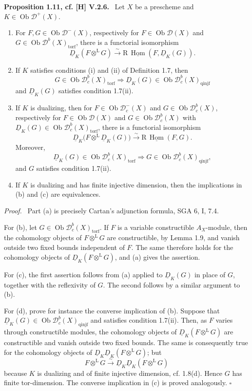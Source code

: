 \documentclass[11pt]{article}
\theoremstyle{plain}
\theoremstyle{definition}
\theoremstyle{remark}
\newenvironment{statement}[1]{\par\medskip\noindent\textbf{#1.}\ }{\par\medskip}
\newenvironment{prooftext}{\par\noindent\textit{Proof.}\ }{\par\medskip}
\newcommand{\D}{\mathcal D}\newcommand{\E}{\mathcal E}\newcommand{\F}{\mathcal F}
\DeclareMathOperator{\Hom}{Hom}
\DeclareMathOperator{\ob}{Ob}
\newcommand{\R}{\mathrm R}
\newcommand{\qedtext}{\hfill$\square$}
\begin{document}
\begin{statement}{Proposition 1.11, cf. [H] V.2.6}
Let $X$ be a prescheme and $K\in\ob\D^+(X)$.
\begin{enumerate}[label=\alph*)]
\item For $F,G\in\ob\D^-(X)$, respectively for $F\in\ob\D(X)$ and $G\in\ob\D^b(X)_{\mathrm{torf}}$, there is a functorial isomorphism
\[
   \underline D_K(F\otimes^{\mathrm L}G)\xrightarrow{\sim}
   \R\,\underline{\Hom}(F,\underline D_K(G)).
\]

\item If $K$ satisfies conditions (i) and (ii) of Definition 1.7, then
\[
   G\in\ob\D_c^b(X)_{\mathrm{torf}}
   \Longrightarrow
   \underline D_K(G)\in\ob\D_c^b(X)_{\mathrm{qinjf}}
\]
and $\underline D_K(G)$ satisfies condition 1.7(ii).

\item If $K$ is dualizing, then for $F\in\ob\D_c^-(X)$ and $G\in\ob\D_c^b(X)$, respectively for $F\in\ob\D(X)$ and $G\in\ob\D_c^b(X)$ with $\underline D_K(G)\in\ob\D_c^b(X)_{\mathrm{torf}}$, there is a functorial isomorphism
\[
   \underline D_K\bigl(F\otimes^{\mathrm L}\underline D_K(G)\bigr)
      \xrightarrow{\sim}\R\,\underline{\Hom}(F,G).
\]
Moreover,
\[
   \underline D_K(G)\in\ob\D_c^b(X)_{\mathrm{torf}}
   \Longrightarrow
   G\in\ob\D_c^b(X)_{\mathrm{qinjf}},
\]
and $G$ satisfies condition 1.7(ii).

\item If $K$ is dualizing and has finite injective dimension, then the implications in (b) and (c) are equivalences.
\end{enumerate}
\end{statement}

\begin{prooftext}
Part (a) is precisely Cartan's adjunction formula, SGA 6, I, 7.4.

For (b), let $G\in\ob\D_c^b(X)_{\mathrm{torf}}$. If $F$ is a variable constructible $A_X$-module, then the cohomology objects of $F\otimes^{\mathrm L}G$ are constructible, by Lemma 1.9, and vanish outside two fixed bounds independent of $F$. The same therefore holds for the cohomology objects of $\underline D_K(F\otimes^{\mathrm L}G)$, and (a) gives the assertion.

For (c), the first assertion follows from (a) applied to $\underline D_K(G)$ in place of $G$, together with the reflexivity of $G$. The second follows by a similar argument to (b).

For (d), prove for instance the converse implication of (b). Suppose that $\underline D_K(G)\in\ob\D_c^b(X)_{\mathrm{qinjf}}$ and satisfies condition 1.7(ii). Then, as $F$ varies through constructible modules, the cohomology objects of $\underline D_K(F\otimes^{\mathrm L}G)$ are constructible and vanish outside two fixed bounds. The same is consequently true for the cohomology objects of $\underline D_K\underline D_K(F\otimes^{\mathrm L}G)$; but
\[
   F\otimes^{\mathrm L}G\xrightarrow{\sim}\underline D_K\underline D_K(F\otimes^{\mathrm L}G)
\]
because $K$ is dualizing and of finite injective dimension, cf. 1.8(d). Hence $G$ has finite tor-dimension. The converse implication in (c) is proved analogously. \qedtext
\end{prooftext}
\end{document}
